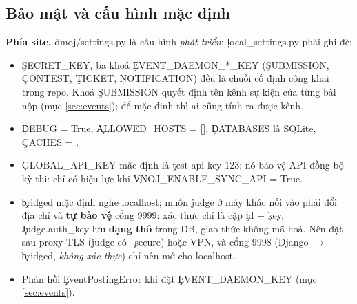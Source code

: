 \subsection{Bảo mật và cấu hình mặc định}\label{sec:judgesec}
\textbf{Phía site.} \f{dmoj/settings.py} là cấu hình \emph{phát triển}; \c{local_settings.py} phải ghi đè: \tS
\begin{itemize}
\item \c{SECRET_KEY}, ba khoá \c{EVENT_DAEMON_*_KEY} (\c{SUBMISSION}, \c{CONTEST}, \c{TICKET}, \c{NOTIFICATION}) đều là chuỗi cố định công khai trong repo. Khoá \c{SUBMISSION} quyết định tên kênh sự kiện của từng bài nộp (mục \ref{sec:events}); để mặc định thì ai cũng tính ra được kênh.
\item \c{DEBUG = True}, \c{ALLOWED_HOSTS = []}, \c{DATABASES} là SQLite, \c{CACHES = {}}.
\item \c{GLOBAL_API_KEY} mặc định là \c{test-api-key-123}; nó bảo vệ API đồng bộ kỳ thi: chỉ có hiệu lực khi \c{VNOJ_ENABLE_SYNC_API = True}.
\item \c{bridged} mặc định nghe \c{localhost}; muốn judge ở máy khác nối vào phải đổi địa chỉ và \textbf{tự bảo vệ} cổng 9999: xác thực chỉ là cặp \c{id} + \c{key}, \c{Judge.auth_key} lưu \textbf{dạng thô} trong DB, giao thức không mã hoá. Nên đặt sau proxy TLS (judge có \c{--secure}) hoặc VPN, và cổng 9998 (Django $\to$ \c{bridged}, \emph{không xác thực}) chỉ nên mở cho localhost.
\item Phản hồi \c{EventPostingError} khi đặt \c{EVENT_DAEMON_KEY} (mục \ref{sec:events}).
\end{itemize}

